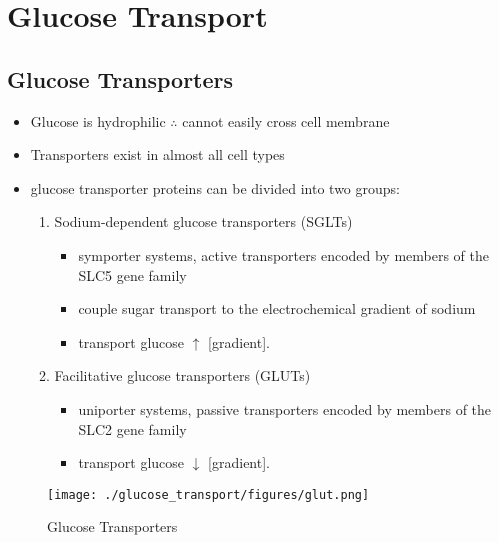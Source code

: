 \documentclass{scrartcl}
\begin{document}
\section{Glucose Transport}
\label{sec:org68df60d}
\subsection{Glucose Transporters}
\label{sec:orgefdd07e}
\begin{itemize}
\item Glucose is hydrophilic \(\therefore\) cannot easily cross cell membrane
\item Transporters exist in almost all cell types
\item glucose transporter proteins can be divided into two groups:
\begin{enumerate}
\item Sodium-dependent glucose transporters (SGLTs)
\begin{itemize}
\item symporter systems, active transporters encoded by members of
the SLC5 gene family
\item couple sugar transport to the electrochemical gradient of sodium
\item transport glucose \(\uparrow\) [gradient].
\end{itemize}
\item Facilitative glucose transporters (GLUTs)
\begin{itemize}
\item uniporter systems, passive transporters encoded by members of the SLC2 gene family
\item transport glucose \(\downarrow\) [gradient].
\end{itemize}
\end{enumerate}
\end{itemize}

\begin{figure}[htbp]
\centering
\texttt{[image: ./glucose\_transport/figures/glut.png]}
\caption[glucose transporters]{\label{fig:orgfa16876}
Glucose Transporters}
\end{figure}
\end{document}
